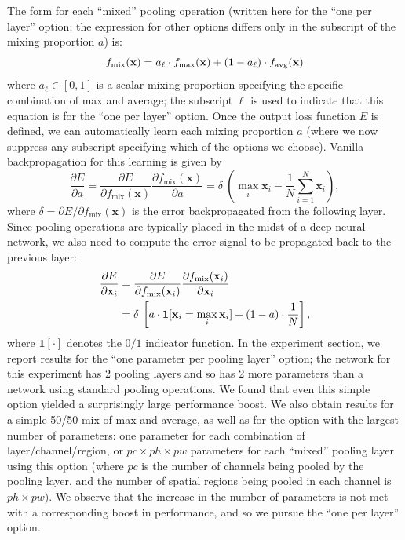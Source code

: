 \documentclass[twoside]{article}
\begin{document}
The form for each ``mixed'' pooling operation (written here for the ``one per layer'' 
option; the expression for other options differs only in the subscript of the mixing 
proportion $a$) is:
\vspace{-3mm}
{\small
\begin{equation}
   f_{\text{mix}}(\mathbf{\mathbf{x}}) = a_{\ell} \cdot f_{\text{max}}({\mathbf{x}})
   + (1-a_{\ell}) \cdot f_{\text{avg}}({\mathbf{x}})
   \vspace{-2.1mm}
\end{equation}
}%
where $a_{\ell} \in [0,1]$ is a scalar mixing proportion specifying the specific 
combination of max and average; the subscript $\ell$ is used to indicate that this equation 
is for the ``one per layer'' option.
Once the output loss function $E$ is defined, we can automatically learn each 
mixing proportion $a$ (where we now suppress any subscript specifying which of 
the options we choose). Vanilla backpropagation for this learning is given by 
\vspace{-2mm}
{\small
\begin{equation}
      \frac{\partial E}{\partial a}
    = \frac{\partial E}{\partial f_{\text{mix}}(\mathbf{x})} 
         \frac{\partial f_{\text{mix}}(\mathbf{x})}{\partial a} 
      = \delta \: (\max_i{{\mathbf{x}}_i} - \frac{1}{N}\sum^{N}_{i=1}{{\mathbf{x}}_i}),
\end{equation}
}%
where $\delta = \partial E / \partial f_{\text{mix}}(\mathbf{x})$ is the error backpropagated
from the following layer. Since pooling operations are typically placed in the midst
of a deep neural network, we also need to compute the error signal to be propagated
back to the previous layer:
\vspace{-2mm}
{\small
\begin{align}
      \frac{\partial E}{\partial \mathbf{x}_{i}}
    &= \frac{\partial E}{\partial f_\text{mix}(\mathbf{x}_{i})} 
         \frac{\partial f_\text{mix}(\mathbf{x}_{i})}{\partial \mathbf{x}_{i}} \\    
      &= \delta \: \left[a \cdot \mathbf{1}[\mathbf{x}_{i} = \max_i{{\mathbf{x}}_i}] + (1-a)\cdot \frac{1}{N}\right],
      \vspace{-2.5mm}
\end{align}
}%
where $\mathbf{1}[\cdot]$ denotes the $0/1$ indicator function. In the experiment 
section, we report results for the ``one parameter per pooling layer'' option; the  
network for this experiment has 2 pooling layers and so has 2 more parameters than 
a network using standard pooling operations. We found that even this simple option 
yielded a surprisingly large performance boost. We also obtain results for a simple 50/50 mix of max and average, 
as well as for the option with the largest number of parameters: one parameter for each 
combination of layer/channel/region, or $pc \times ph \times pw$ parameters for each ``mixed'' pooling layer using this
option (where $pc$ is the number of channels being pooled by the pooling layer, 
and the number of spatial regions being pooled in each channel is $ph\times pw$). 
We observe that the increase in the number of parameters is not met with 
a corresponding boost in performance, and so we pursue the ``one per layer'' option.
\end{document}
